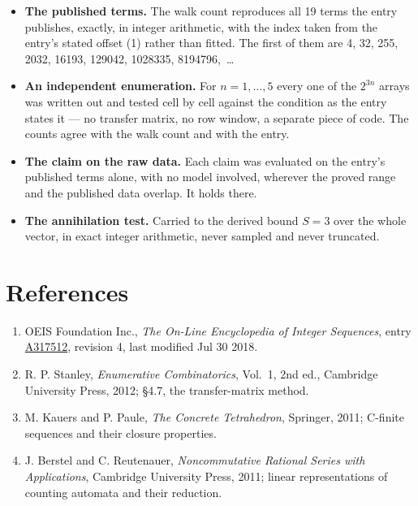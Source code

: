 \documentclass[11pt]{article}
\theoremstyle{definition}
\begin{document}
\begin{itemize}

\item {\bfseries The published terms.} The walk count reproduces all 19 terms the entry publishes, exactly, in integer arithmetic, with the index taken from the entry's stated offset (1) rather than fitted. The first of them are 4, 32, 255, 2032, 16193, 129042, 1028335, 8194796,~\dots

\item {\bfseries An independent enumeration.} For $n = 1,\dots,5$ every one of the $2^{3n}$ arrays was written out and tested cell by cell against the condition as the entry states it --- no transfer matrix, no row window, a separate piece of code. The counts agree with the walk count and with the entry.

\item {\bfseries The claim on the raw data.} Each claim was evaluated on the entry's published terms alone, with no model involved, wherever the proved range and the published data overlap. It holds there.

\item {\bfseries The annihilation test.} Carried to the derived bound $S = 3$ over the whole vector, in exact integer arithmetic, never sampled and never truncated.

\end{itemize}

\section{References}

\begin{enumerate}

\item OEIS Foundation Inc., \emph{The On-Line Encyclopedia of Integer Sequences}, entry \href{https://oeis.org/A317512}{A317512}, revision 4, last modified Jul 30 2018.

\item R. P. Stanley, \emph{Enumerative Combinatorics}, Vol.~1, 2nd ed., Cambridge University Press, 2012; \S4.7, the transfer-matrix method.

\item M. Kauers and P. Paule, \emph{The Concrete Tetrahedron}, Springer, 2011; C-finite sequences and their closure properties.

\item J. Berstel and C. Reutenauer, \emph{Noncommutative Rational Series with Applications}, Cambridge University Press, 2011; linear representations of counting automata and their reduction.

\end{enumerate}
\end{document}
